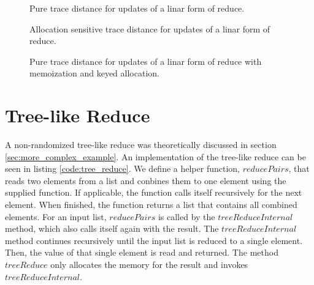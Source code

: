 \begin{figure}
\centering
{}
\caption{Pure trace distance for updates of a linar form of reduce.}
\label{plot:reduce_pure}
\end{figure}

\begin{figure}
\centering
{}
\caption{Allocation sensitive trace distance for updates of a linar form of reduce.}
\label{plot:reduce_alloc}
\end{figure}

\begin{figure}
\centering
{}
\caption{Pure trace distance for updates of a linar form of reduce with memoization and keyed allocation.}
\label{plot:memo_reduce_pure}
\end{figure}

\section{Tree-like Reduce}

A non-randomized tree-like reduce was theoretically discussed in section \ref{sec:more_complex_example}. An implementation of the tree-like reduce can be seen in listing \ref{code:tree_reduce}. We define a helper function, $reducePairs$, that reads two elements from a list and conbines them to one element using the supplied function. If applicable, the function calls itself recursively for the next element. When finished, the function returns a list that contains all combined elements. For an input list, $reducePairs$ is called by the $treeReduceInternal$ method, which also calls itself again with the result. The $treeReduceInternal$ method continues recursively until the input list is reduced to a single element. Then, the value of that single element is read and returned. The method $treeReduce$ only allocates the memory for the result and invokes $treeReduceInternal$.

